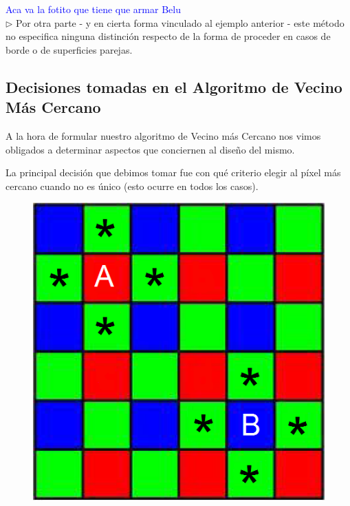\documentclass[a4paper]{article}
\begin{document}
\textcolor{blue}{Aca va la fotito que tiene que armar Belu}\\

$\triangleright$ Por otra parte - y en cierta forma vinculado al ejemplo anterior - este método no especifica ninguna distinción respecto de la forma de proceder en casos de borde o de superficies parejas. \\


\newpage
\subsection*{Decisiones tomadas en el Algoritmo de Vecino M\'as Cercano}

A la hora de formular nuestro algoritmo de Vecino m\'as Cercano nos vimos obligados a determinar aspectos que conciernen al dise\~no del mismo. 

La principal decisi\'on que debimos tomar fue con qu\'e criterio elegir al p\'ixel m\'as cercano cuando no es \'unico (esto ocurre en todos los casos). 

\begin{figure}[h!]
	\caption{}
	\begin{center}
	\includegraphics[scale=0.36]{imagenes/vecino1}
	\label{Vecino1}
  \end{center}
\end{figure}
\end{document}
